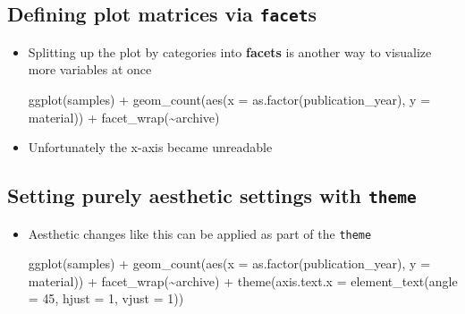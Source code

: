 \documentclass[
  letterpaper,
]{book}
\newenvironment{Shaded}{}{}
\newcommand{\AttributeTok}[1]{\textcolor[rgb]{0.84,0.23,0.29}{#1}}
\newcommand{\DecValTok}[1]{\textcolor[rgb]{0.00,0.36,0.77}{#1}}
\newcommand{\FunctionTok}[1]{\textcolor[rgb]{0.44,0.26,0.76}{#1}}
\newcommand{\NormalTok}[1]{\textcolor[rgb]{0.14,0.16,0.18}{#1}}
\newcommand{\SpecialCharTok}[1]{\textcolor[rgb]{0.00,0.36,0.77}{#1}}
\begin{document}
\hypertarget{defining-plot-matrices-via-facets}{%
\subsection{\texorpdfstring{Defining plot matrices via
\texttt{facet}s}{Defining plot matrices via facets}}\label{defining-plot-matrices-via-facets}}

\begin{itemize}
\item
  Splitting up the plot by categories into \textbf{facets} is another
  way to visualize more variables at once

\begin{Shaded}
\begin{Highlighting}[]
\FunctionTok{ggplot}\NormalTok{(samples) }\SpecialCharTok{+}
\FunctionTok{geom\_count}\NormalTok{(}\FunctionTok{aes}\NormalTok{(}\AttributeTok{x =} \FunctionTok{as.factor}\NormalTok{(publication\_year), }\AttributeTok{y =}\NormalTok{ material)) }\SpecialCharTok{+}
\FunctionTok{facet\_wrap}\NormalTok{(}\SpecialCharTok{\textasciitilde{}}\NormalTok{archive)}
\end{Highlighting}
\end{Shaded}
\item
  Unfortunately the x-axis became unreadable
\end{itemize}

\hypertarget{setting-purely-aesthetic-settings-with-theme}{%
\subsection{\texorpdfstring{Setting purely aesthetic settings with
\texttt{theme}}{Setting purely aesthetic settings with theme}}\label{setting-purely-aesthetic-settings-with-theme}}

\begin{itemize}
\item
  Aesthetic changes like this can be applied as part of the
  \texttt{theme}

\begin{Shaded}
\begin{Highlighting}[]
\FunctionTok{ggplot}\NormalTok{(samples) }\SpecialCharTok{+}
\FunctionTok{geom\_count}\NormalTok{(}\FunctionTok{aes}\NormalTok{(}\AttributeTok{x =} \FunctionTok{as.factor}\NormalTok{(publication\_year), }\AttributeTok{y =}\NormalTok{ material)) }\SpecialCharTok{+}
\FunctionTok{facet\_wrap}\NormalTok{(}\SpecialCharTok{\textasciitilde{}}\NormalTok{archive) }\SpecialCharTok{+}
\FunctionTok{theme}\NormalTok{(}\AttributeTok{axis.text.x =} \FunctionTok{element\_text}\NormalTok{(}\AttributeTok{angle =} \DecValTok{45}\NormalTok{, }\AttributeTok{hjust =} \DecValTok{1}\NormalTok{, }\AttributeTok{vjust =} \DecValTok{1}\NormalTok{))}
\end{Highlighting}
\end{Shaded}
\end{itemize}
\end{document}

